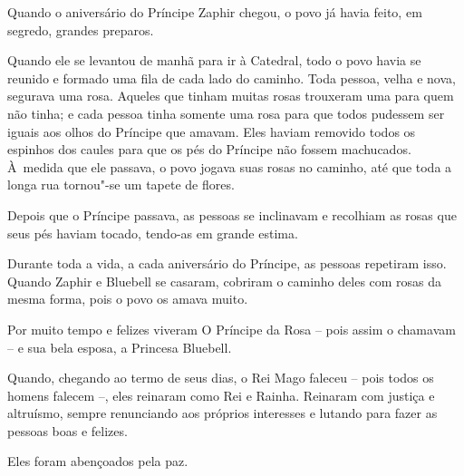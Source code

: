 Quando o aniversário do Príncipe Zaphir chegou, o povo já havia feito,
em segredo, grandes preparos.

Quando ele se levantou de manhã para ir à Catedral, todo o povo havia se
reunido e formado uma fila de cada lado do caminho. Toda pessoa, velha e
nova, segurava uma rosa. Aqueles que tinham muitas rosas trouxeram uma
para quem não tinha; e cada pessoa tinha somente uma rosa para que todos
pudessem ser iguais aos olhos do Príncipe que amavam. Eles haviam
removido todos os espinhos dos caules para que os pés do Príncipe não
fossem machucados. À~medida que ele passava, o povo jogava suas rosas no
caminho, até que toda a longa rua tornou"-se um tapete de flores.

Depois que o Príncipe passava, as pessoas se inclinavam e recolhiam as rosas
que seus pés haviam tocado, tendo-as em grande estima.

Durante toda a vida, a cada aniversário do Príncipe, as pessoas repetiram
isso. Quando Zaphir e Bluebell se casaram, cobriram o caminho deles com
rosas da mesma forma, pois o povo os amava muito.

Por muito tempo e felizes viveram O Príncipe da Rosa -- pois assim o
chamavam -- e sua bela esposa, a Princesa Bluebell.

Quando, chegando ao termo de seus dias, o Rei Mago faleceu -- pois todos
os homens falecem --, eles reinaram como Rei e Rainha. Reinaram com
justiça e altruísmo, sempre renunciando aos próprios interesses e
lutando para fazer as pessoas boas e felizes.

Eles foram abençoados pela paz.
